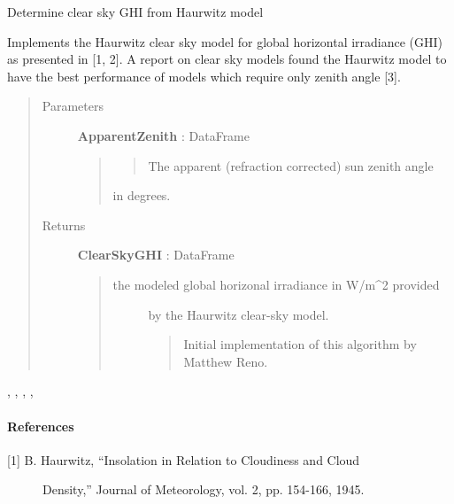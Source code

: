 \documentclass[letterpaper,10pt,english]{sphinxmanual}
\begin{document}
\begin{fulllineitems}
\label{stubs/pvlib.pvl_clearsky_haurwitz:pvlib.pvl_clearsky_haurwitz}
Determine clear sky GHI from Haurwitz model

Implements the Haurwitz clear sky model for global horizontal
irradiance (GHI) as presented in {[}1, 2{]}. A report on clear
sky models found the Haurwitz model to have the best performance of
models which require only zenith angle {[}3{]}.
\begin{quote}\begin{description}
\item[{Parameters}] \leavevmode
\textbf{ApparentZenith} : DataFrame
\begin{quote}
\begin{quote}

The apparent (refraction corrected) sun zenith angle
\end{quote}

in degrees.
\end{quote}

\item[{Returns}] \leavevmode
\textbf{ClearSkyGHI} : DataFrame
\begin{quote}
\begin{description}
\item[{the modeled global horizonal irradiance in W/m\textasciicircum{}2 provided}] \leavevmode
by the Haurwitz clear-sky model.
\begin{quote}

Initial implementation of this algorithm by Matthew Reno.
\end{quote}

\end{description}
\end{quote}

\end{description}\end{quote}




, {\hyperref[stubs/pvlib.pvl_makelocationstruct:pvlib.pvl_makelocationstruct]{}}, {\hyperref[stubs/pvlib.pvl_ephemeris:pvlib.pvl_ephemeris]{}}, {\hyperref[stubs/pvlib.pvl_spa:pvlib.pvl_spa]{}}, 


\paragraph{References}
\begin{description}
\item[{{[}1{]} B. Haurwitz, ``Insolation in Relation to Cloudiness and Cloud }] \leavevmode
Density,'' Journal of Meteorology, vol. 2, pp. 154-166, 1945.


\end{description}
\end{fulllineitems}
\end{document}
